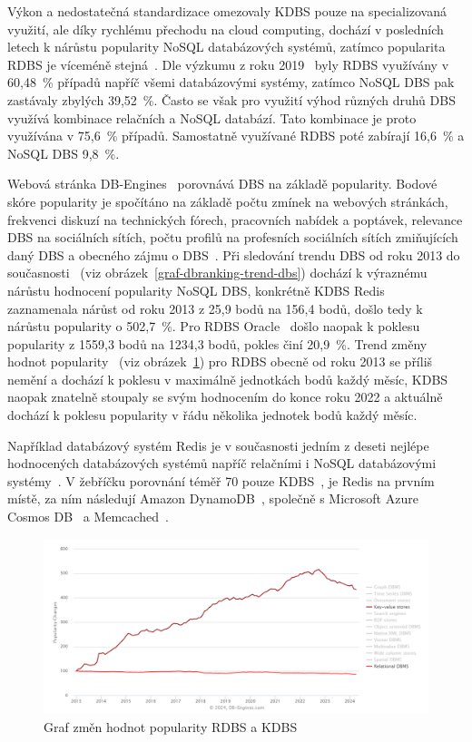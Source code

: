\documentclass[czech,master,dept460,male,csharp,cpdeclaration]{diploma}
\begin{document}
	Výkon a nedostatečná standardizace omezovaly KDBS pouze na specializovaná využití, ale díky rychlému přechodu na cloud computing, dochází v posledních letech k nárůstu popularity NoSQL databázových systémů, zatímco popularita RDBS je víceméně stejná~\cite{dbranking-trend-by-model}. Dle výzkumu z roku 2019~\cite{scalegrid-sql-vs-nosql} byly RDBS využívány v 60,48~\% případů napříč všemi databázovými systémy, zatímco NoSQL DBS pak zastávaly zbylých 39,52~\%. Často se však pro využití výhod různých druhů DBS využívá kombinace relačních a NoSQL databází. Tato kombinace je proto využívána v 75,6~\% případů. Samostatně využívané RDBS poté zabírají 16,6~\% a NoSQL DBS 9,8~\%.
	
	Webová stránka DB-Engines~\cite{dbranking-web-index} porovnává DBS na základě popularity. Bodové skóre popularity je spočítáno na základě počtu zmínek na webových stránkách, frekvenci diskuzí na technických fórech, pracovních nabídek a poptávek, relevance DBS na sociálních sítích, počtu profilů na profesních sociálních sítích zmiňujících daný DBS a obecného zájmu o DBS~\cite{dbranking-ranking-definition}. Při sledování trendu DBS od roku 2013 do současnosti~\cite{dbranking-trend-by-dbs} (viz obrázek~\ref{graf-dbranking-trend-dbs}) dochází k výraznému nárůstu hodnocení popularity NoSQL DBS, konkrétně KDBS Redis~\cite{redis} zaznamenala nárůst od roku 2013 z 25,9 bodů na 156,4 bodů, došlo tedy k nárůstu popularity o 502,7~\%. Pro RDBS Oracle~\cite{oracle-index} došlo naopak k poklesu popularity z 1559,3 bodů na 1234,3 bodů, pokles činí 20,9~\%. Trend změny hodnot popularity~\cite{dbranking-trend-by-model} (viz obrázek~\ref{graf-dbranking-trend-model}) pro RDBS obecně od roku 2013 se příliš nemění a dochází k poklesu v maximálně jednotkách bodů každý měsíc, KDBS naopak znatelně stoupaly se svým hodnocením do konce roku 2022 a aktuálně dochází k poklesu popularity v řádu několika jednotek bodů každý měsíc.
	
	Například databázový systém Redis je v současnosti jedním z deseti nejlépe hodnocených databázových systémů napříč relačními i NoSQL databázovými systémy~\cite{db-engineers-ranking}. V žebříčku porovnání téměř 70 pouze KDBS~\cite{db-engineers-ranking-kdbs}, je Redis na prvním místě, za ním následují Amazon DynamoDB~\cite{dynamodb}, společně s Microsoft Azure Cosmos DB~\cite{azure-cosmos-db} a Memcached~\cite{memcached}.

	\begin{figure}
		\centering
		\includegraphics[scale=0.65]{Data/db-engine-trend-model.PNG}
		\caption{Graf změn hodnot popularity RDBS a KDBS~\cite{dbranking-trend-by-model}\label{graf-dbranking-trend-model}}
	\end{figure}
	
\end{document}
